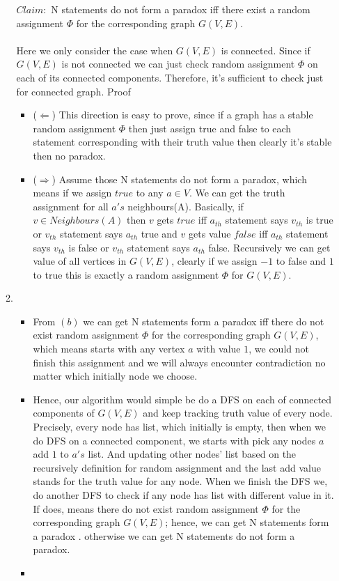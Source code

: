 \documentclass[11pt,twoside]{article}
\begin{document}
\begin{enumerate}[leftmargin=0pt]
\begin{enumerate}[topsep=\parsep]
	  $Claim:$ N statements do not form a paradox iff there exist a random assignment $\Phi$ for the corresponding graph $G(V,E)$. \\
	  \\ Here we only consider the case when $G(V, E)$ is connected. Since if $G(V, E)$ is not connected we can just check  random assignment $\Phi$  on each of its connected components. Therefore, it's sufficient to check just for connected graph.
	Proof
	\begin{itemize}
	\item ($\Leftarrow$) This direction is easy to prove, since if a graph has a stable random assignment $\Phi$ then just assign true and false to each statement
	corresponding with their truth value then clearly it's stable then no paradox.
	\item ($\Rightarrow$) Assume those N statements do not form a paradox, which means if we assign $true$ to any $a \in V$. We can get the truth assignment for all $a's$ neighbours(A). Basically, if $v \in Neighbours(A)$ then $v$ gets $true$ iff  $a_{th}$ statement says $v_{th}$  is true or $v_{th}$ statement says $a_{th}$ true and $v$ gets value $false$ iff  $a_{th}$ statement says $v_{th}$ is false or $v_{th}$ statement says $a_{th}$ false. Recursively we can get value of all vertices in $G(V,E)$, clearly if we assign $-1$ to false and $1$ to true this is exactly a random assignment $\Phi$ for $G(V,E)$.
	\end{itemize} 

	
	\item  
	\begin{itemize}[label = {}]
		\item From $(b)$ we can get N statements  form a paradox iff there do not exist random assignment $\Phi$ for the corresponding graph $G(V,E)$, which means starts with any vertex $a$ with value $1$, we could not finish this assignment and we will always encounter contradiction no matter which initially node we choose.
		\item Hence, our algorithm would simple be do a DFS on each of connected components of $G(V,E)$ and keep tracking truth value of every node. Precisely, every node has list, which initially is empty, then when we do DFS  on a connected component, we starts with pick any nodes $a$ add $1$ to $a's$ list. And updating other nodes' list based on the recursively definition for random assignment and the last add value stands for the truth value for any node. When we finish the DFS we, do another DFS to check if any node has list with different value in it. If does, means there do not exist random assignment $\Phi$ for the corresponding graph $G(V,E)$; hence, we can get N statements  form a paradox . otherwise we can get N statements  do not form a paradox.
		\item  


\end{itemize}
\end{enumerate}
\end{enumerate}
\end{document}
